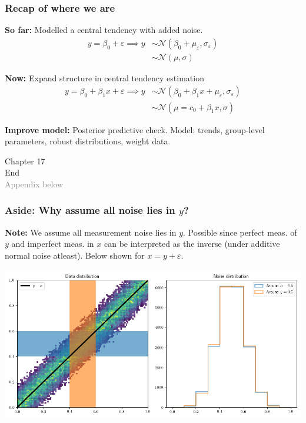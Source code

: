 \documentclass[usenames,dvipsnames,table]{beamer}
\begin{document}
\begin{frame}
\frametitle{Recap of where we are}

\textbf{So far:} Modelled a central tendency with added noise.
\begin{align*}
y = \beta_0 + \varepsilon
  \implies y &\sim \mathcal{N}(\beta_0 + \mu_\varepsilon, \sigma_\varepsilon) \\
             &\sim \mathcal{N}(\mu, \sigma)
\end{align*}

\vspace{1em}
\textbf{Now:} Expand structure in central tendency estimation
\begin{align*}
y  = \beta_0 + \beta_1 x + \varepsilon
  \implies y &\sim \mathcal{N}(\beta_0 + \beta_1 x + \mu_\varepsilon, \sigma_\varepsilon)\\
             &\sim \mathcal{N}(\mu=c_0 + \beta_1 x, \sigma)
\end{align*}

\vspace{1em}
\textbf{Improve model:} Posterior predictive check. Model: trends, group-level parameters,  robust distributions, weight data.

\end{frame}






\begin{frame}
\begin{center}
{\huge{Chapter 17}}
\Large
\\\vspace{2em}
End\\
\vspace{1em}
\textcolor{gray}{Appendix below}
\vspace{5em}
\end{center}
\end{frame}








\begin{frame}
\frametitle{Aside: Why assume all noise lies in $y$?}
\textbf{Note:} We assume all measurement noise lies in $y$. Possible since perfect meas. of $y$ and imperfect meas. in $x$ can be interpreted as the inverse (under additive normal noise atleast). Below shown for $x = y + \varepsilon$.

\includegraphics[width=\textwidth]{img/noise}
\end{frame}
\end{document}
